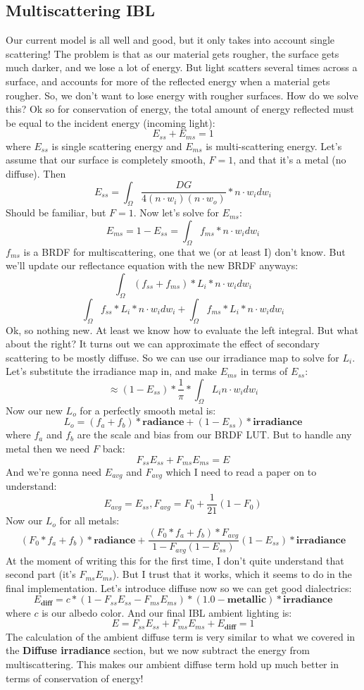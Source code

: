 \documentclass{article}
\begin{document}
\subsection{Multiscattering IBL}
Our current model is all well and good, but it only takes into account single scattering! The problem is that as our material gets rougher, the surface gets much darker, and we lose a lot of energy. But light scatters several times across a surface, and accounts for more of the reflected energy when a material gets rougher. So, we don't want to lose energy with rougher surfaces. How do we solve this? Ok so for conservation of energy, the total amount of energy reflected must be equal to the incident energy (incoming light):
\[E_{ss} + E_{ms} = 1\]
where \(E_{ss}\) is single scattering energy and \(E_{ms}\) is multi-scattering energy. Let's assume that our surface is completely smooth, \(F = 1\), and that it's a metal (no diffuse). Then \[E_{ss} = \int_{\Omega} \frac{DG}{4(n \cdot w_i)(n \cdot w_o)} * n \cdot w_i dw_i\] 
Should be familiar, but \(F = 1\). Now let's solve for \(E_{ms}\):
\[E_{ms} = 1 - E_{ss} = \int_{\Omega} f_{ms} * n \cdot w_i dw_i\]
\(f_{ms}\) is a BRDF for multiscattering, one that we (or at least I) don't know. But we'll update our reflectance equation with the new BRDF anyways:
\[\int_{\Omega} (f_{ss} + f_{ms}) * L_i * n \cdot w_i dw_i\]
\[\int_{\Omega} f_{ss} * L_i * n \cdot w_i dw_i + \int_{\Omega} f_{ms} * L_i * n \cdot w_i dw_i\]
Ok, so nothing new. At least we know how to evaluate the left integral. But what about the right? It turns out we can approximate the effect of secondary scattering to be mostly diffuse. So we can use our irradiance map to solve for \(L_i\). Let's substitute the irradiance map in, and make \(E_{ms}\) in terms of \(E_{ss}\):
\[\approx (1 - E_{ss}) * \frac{1}{\pi} * \int_{\Omega} L_i n \cdot w_i dw_i\]
Now our new \(L_o\) for a perfectly smooth metal is:
\[L_o = (f_a + f_b) * \textbf{radiance} + (1 - E_{ss}) * \textbf{irradiance}\]
where \(f_a\) and \(f_b\) are the scale and bias from our BRDF LUT.
But to handle any metal then we need \(F\) back:
\[F_{ss}E_{ss} + F_{ms}E_{ms} = E\]
And we're gonna need \(E_{avg}\) and \(F_{avg}\) which I need to read a paper on to understand:
\[E_{avg} = E_{ss}, F_{avg} = F_0 + \frac{1}{21}(1 - F_0)\]
Now our \(L_o\) for all metals:
\[(F_0*f_a + f_b)*\textbf{radiance} + \frac{(F_0*f_a + f_b)*F_{avg}}{1 - F_{avg}(1 - E_{ss})}(1 - E_{ss}) * \textbf{irradiance}\]
At the moment of writing this for the first time, I don't quite understand that second part (it's \(F_{ms}E_{ms}\)). But I trust that it works, which it seems to do in the final implementation. Let's introduce diffuse now so we can get good dialectrics:
\[E_{\textbf{diff}} = c * (1 - F_{ss}E_{ss} - F_{ms}E_{ms}) * (1.0 -\textbf{metallic}) * \textbf{irradiance}\]
where \(c\) is our albedo color. And our final IBL ambient lighting is:
\[E = F_{ss}E_{ss} + F_{ms}E_{ms} + E_{\textbf{diff}} = 1\]
The calculation of the ambient diffuse term is very similar to what we covered in the \textbf{Diffuse irradiance} section, but we now subtract the energy from multiscattering. This makes our ambient diffuse term hold up much better in terms of conservation of energy!
\end{document}
